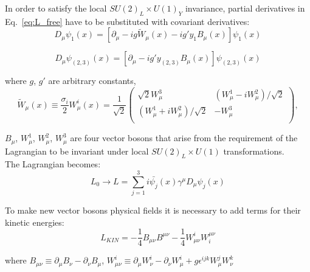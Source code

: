 In order to satisfy the local $SU(2)_L \times U(1)_Y$ invariance, partial derivatives in Eq.~\ref{eq:L_free} have to be substituted with covariant derivatives:\\

\begin{equation}
D_\mu \psi_1(x) = [\partial_\mu - i g {\tilde{W}}_\mu(x) - i g' y_1 B_\mu(x) ] \psi_1(x) 
\end{equation}

\begin{equation}
D_\mu \psi_{(2,3)}(x) = [\partial_\mu - i g' y_{(2,3)} B_\mu(x) ] \psi_{(2,3)}(x) 
\end{equation}

where $g$, $g'$ are arbitrary constants,\\ 

\begin{equation}
  {\tilde{W}}_\mu(x) \equiv \frac{\sigma_i}{2} W_\mu^i(x) = \frac{1}{\sqrt{2}} 
  \begin{pmatrix}
  \sqrt{2} W_\mu^3 & (W_\mu^1 - i W_\mu^2)/{\sqrt{2}}\\
  (W_\mu^1 + i W_\mu^2)/{\sqrt{2}} & -W_\mu^3\\
  \end{pmatrix} , 
\end{equation}

$B_\mu$, $W_\mu^1$, $W_\mu^2$, $W_\mu^3$ are four vector bosons that arise from the requirement of the Lagrangian to be invariant under local $SU(2)_L \times U(1)$ transformations.\\

The Lagrangian becomes:\\

\begin{equation}\label{eq:L_free_covariant}
L_0 \rightarrow L = \sum_{j=1}^{3} i \bar{\psi_j}(x) \gamma^\mu D_\mu \psi_j(x) 
\end{equation}

To make new vector bosons physical fields it is necessary to add terms for their kinetic energies:\\

\begin{equation} \label{eq:L_gauge_kin}
L_{KIN}=-\frac{1}{4}B_{\mu\nu}B^{\mu\nu}-\frac{1}{4}W_{\mu\nu}^i W^{\mu\nu}_i
\end{equation}

where $B_{\mu\nu} \equiv \partial_\mu B_\nu - \partial_\nu B_\mu$, $W_{\mu\nu}^i \equiv \partial_\mu W_\nu^i - \partial_\nu W_\mu^i + g \epsilon^{ijk} W_\mu^j W_\nu^k$\\

